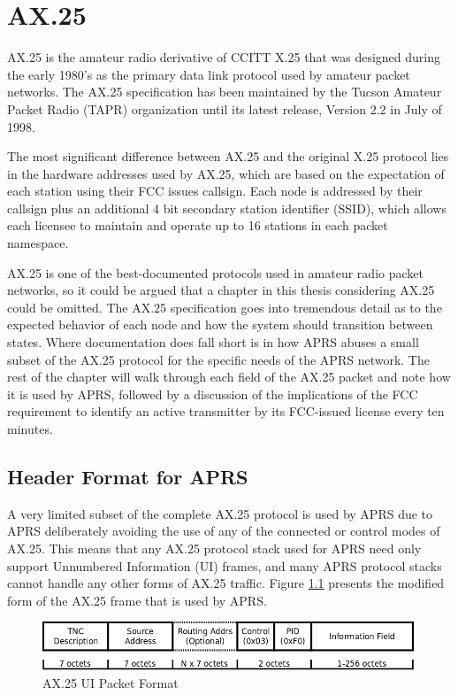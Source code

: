 \chapter{AX.25}

AX.25 is the amateur radio derivative of CCITT X.25 that was designed during the early 1980's 
as the primary data link protocol used by amateur packet networks.
The AX.25 specification has been maintained by the Tucson Amateur Packet Radio (TAPR) 
organization until its latest release, Version 2.2 in July of 1998. 

The most significant difference between AX.25 and the original X.25 protocol lies
in the hardware addresses used by AX.25, which are based on the expectation of
each station using their FCC issues callsign. 
Each node is addressed by their callsign plus an additional 4 bit 
secondary station identifier (SSID), which allows each licensee to maintain and operate 
up to 16 stations in each packet namespace.

AX.25 is one of the best-documented protocols used in amateur radio packet networks,
so it could be argued that a chapter in this thesis considering AX.25 could be omitted.
The AX.25 specification goes into tremendous detail as to the expected behavior of each
node and how the system should transition between states.
Where documentation does fall short is in how APRS abuses a small subset of 
the AX.25 protocol for the specific needs of the APRS network.
The rest of the chapter will walk through each field of the AX.25 packet and
note how it is used by APRS, followed by a discussion of the implications of the FCC
requirement to identify an active transmitter by its FCC-issued license every ten minutes.

\section{Header Format for APRS}

A very limited subset of the complete AX.25 protocol is used by APRS due to APRS 
deliberately avoiding the use of any of the connected or control modes of AX.25. This 
means that any AX.25 protocol stack used for APRS need only support Unnumbered Information (UI)
frames, and many APRS protocol stacks cannot handle any other forms of AX.25 traffic. 
Figure \ref{fig:ax25uiformat} presents the modified form of the AX.25 frame that is used
by APRS.

\begin{figure}
	\centering
	\includegraphics[width=1.0\textwidth]{src/dia/ax25ui}
	\caption{AX.25 UI Packet Format}
	\label{fig:ax25uiformat}
\end{figure}

